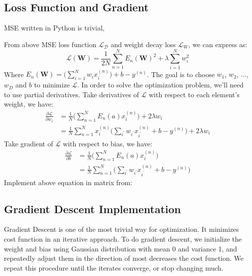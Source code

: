 \documentclass[10pt,letterpaper]{article}
\begin{document}
\subsection{Loss Function and Gradient}

\qquad  MSE written in Python is trivial, 

\qquad From above MSE loss function $\mathcal{L}_{\mathcal{D}}$ and weight decay loss $\mathcal{L}_{W}$, we can express as: 
\begin{equation*}
    \mathcal{L}(\textbf{W}) = \frac{1}{2N}\sum_{n=1}^{N} E_{n}(\textbf{W})^{2} + \lambda \sum_{i=1}^{N} w_{i}^{2}
\end{equation*}
\qquad Where $E_{n}(\textbf{W}) = \textbf{(}\sum_{i=1}^{N}w_{i}x_{i}^{(n)}\textbf{)} + b - y^{(n)}$. The goal is to choose $w_{1}$, $w_{2}$, $\dots$, $w_{D}$ and $b$ to minimize $\mathcal{L}$. In order to solve the optimization problem, we'll need to use partial derivatives. Take derivatives of $\mathcal{L}$ with respect to each element's weight, we have: 
\begin{align*}
    \frac{\partial \mathcal{L}}{\partial w_{i}} &= \frac{1}{N} \textbf{(}\sum_{n=1}^{N} E_{n}(a)  x_{i}^{(n)}\textbf{)} + 2\lambda w_{i} \\
    & = \frac{1}{N} \sum_{n=1}^{N} x_{i}^{(n)} \textbf{(} \sum_{i^{'}}w_{i^{'}}x_{i^{'}}^{(n)} + b - y^{(n)}\textbf{)} + 2\lambda w_{i}
\end{align*}
\qquad Take gradient of $\mathcal{L}$ with respect to bias, we have: 
\begin{align*}
    \frac{\partial \mathcal{L}}{\partial b} &= \frac{1}{N} \textbf{(}\sum_{n=1}^{N} E_{n}(a)  x_{i}^{(n)}\textbf{)}  \\
    & = \frac{1}{N} \sum_{n=1}^{N} \textbf{(} \sum_{i^{'}}w_{i^{'}}x_{i^{'}}^{(n)} + b - y^{(n)}\textbf{)}
\end{align*}
\qquad Implement above equation in matrix from: 



\subsection{Gradient Descent Implementation}

\qquad Gradient Descent is one of the most trivial way for optimization. It minimizes cost function in an iterative approach. To do gradient descent, we initialize the weight and bias using Gaussian distribution with mean 0 and variance 1, and repeatedly adjust them in the direction of most decreases the cost function. We repeat this procedure until the iterates converge, or stop changing much. \\
\end{document}
